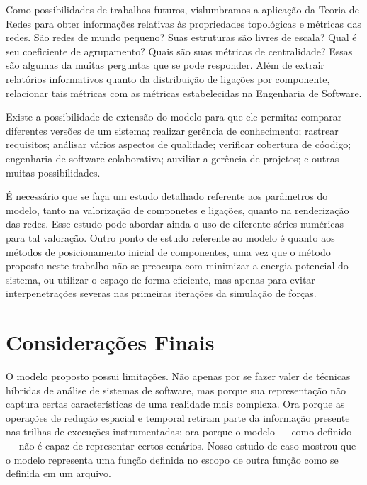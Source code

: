 Como possibilidades de trabalhos futuros, vislumbramos a aplicação da Teoria de
Redes para obter informações relativas às propriedades topológicas e métricas
das redes. São redes de mundo pequeno? Suas estruturas são livres de escala?
Qual é seu coeficiente de agrupamento? Quais são suas métricas de centralidade?
Essas são algumas da muitas perguntas que se pode responder.
Além de extrair relatórios informativos quanto da distribuição de ligações por
componente, relacionar tais métricas com as métricas estabelecidas na Engenharia
de Software.

Existe a possibilidade de extensão do modelo para que ele permita: comparar
diferentes versões de um sistema;
realizar gerência de conhecimento;
rastrear requisitos;
análisar vários aspectos de qualidade;
verificar cobertura de cóodigo;
engenharia de software colaborativa;
auxiliar a gerência de projetos;
e outras muitas possibilidades. 

É necessário que se faça um estudo detalhado referente aos parâmetros do modelo,
tanto na valorização de componetes e ligações, quanto na renderização das redes.
Esse estudo pode abordar ainda o uso de diferente séries numéricas para tal
valoração.
Outro ponto de estudo referente ao modelo é quanto aos métodos de posicionamento
inicial de componentes, uma vez que o método proposto neste trabalho não se
preocupa com minimizar a energia potencial do sistema, ou utilizar o espaço de
forma eficiente, mas apenas para evitar interpenetrações severas nas primeiras
iterações da simulação de forças.



\section{Considerações Finais}
\label{sec:FinalConsiderations}

O modelo proposto possui limitações. Não apenas por se fazer valer de técnicas
híbridas de análise de sistemas de software, mas porque sua representação não
captura certas características de uma realidade mais complexa. Ora porque as
operações de redução espacial e temporal retiram parte da informação presente
nas trilhas de execuções instrumentadas; ora porque o modelo --- como definido
--- não é capaz de representar certos cenários. Nosso estudo de caso mostrou
que o modelo representa uma função definida no escopo de outra função como se
definida em um arquivo.

